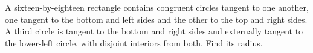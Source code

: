 A sixteen-by-eighteen rectangle contains congruent circles tangent to one another, one tangent to the bottom and left sides and the other to the top and right sides. A third circle is tangent to the bottom and right sides and externally tangent to the lower-left circle, with disjoint interiors from both. Find its radius.
